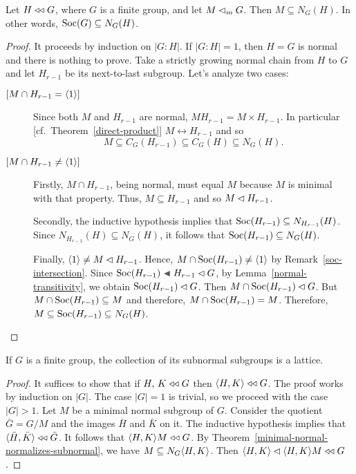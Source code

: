 \begin{thm}\label{minimal-normal-normalizes-subnormal}
    Let\/ $H\mathrel{\triangleleft\triangleleft} G$, where\/ $G$ is a finite group, and let $M\lhd_mG$. Then $M \subseteq N_G(H)$. In other words, ${\rm Soc}(G)\subseteq N_G(H)$.
\end{thm}

\begin{proof} It proceeds by induction on $|G:H|$. If $|G:H|=1$, then $H=G$ is normal and there is nothing to prove. Take a strictly growing normal chain from $H$ to $G$ and let $H_{r-1}$ be its next-to-last subgroup. Let's analyze two cases:
\begin{description}
    \item[\small${[}M\cap H_{r-1}=\langle1\rangle{]}$] Since both $M$ and $H_{r-1}$ are normal, $MH_{r-1}=M\times H_{r-1}$. In particular [cf.~Theorem~\ref{direct-product}] $M\leftrightarrow H_{r-1}$ and so
    $$
        M \subseteq C_G(H_{r-1})\subseteq C_G(H) \subseteq N_G(H).
    $$
    
    \item[\small${[}M\cap H_{r-1}\ne\langle1\rangle{]}$] Firstly, $M\cap H_{r-1}$, being normal, must equal $M$ because $M$ is minimal with that property. Thus, $M\subseteq H_{r-1}$ and so $M\lhd H_{r-1}$. 
    
    Secondly, the inductive hypothesis implies that ${\rm Soc}(H_{r-1})\subseteq N_{H_{r-1}}(H)$. Since $N_{H_{r-1}}(H)\subseteq N_G(H)$, it follows that ${\rm Soc}(H_{r-1})\subseteq N_G(H)$.
    
    Finally, $\langle1\rangle\ne M\lhd H_{r-1}$. Hence, $M\cap{\rm Soc}(H_{r-1})\ne\langle1\rangle$ by Remark~\ref{soc-intersection}. Since $\Soc(H_{r-1})\ch H_{r-1}\normal G$, by Lemma~\ref{normal-transitivity}, we obtain ${\rm Soc}(H_{r-1})\lhd G$. Then $M\cap{\rm Soc}(H_{r-1})\lhd G$. But $M\cap{\rm Soc}(H_{r-1})\subseteq M$ and therefore, $M\cap{\rm Soc}(H_{r-1})=M$. Therefore, $M \subseteq {\rm Soc}(H_{r-1})\subseteq N_G(H)$.
\end{description}
\end{proof}

\begin{thm}\label{subnormal-lattice}
    If\/ $G$ is a finite group, the collection of its subnormal subgroups is a lattice.
\end{thm}

\begin{proof} It suffices to show that if $H,\,K \mathrel{\triangleleft\triangleleft} G$ then\/ $\langle H,K\rangle \mathrel{\triangleleft\triangleleft} G$. The proof works by induction on $|G|$. The case $|G|=1$ is trivial, so we proceed with the case $|G|>1$. Let $M$ be a minimal normal subgroup of $G$. Consider the quotient $\bar G=G/M$ and the images $\bar H$ and $\bar K$ on it. The inductive hypothesis implies that $\langle\bar H,\bar K\rangle\mathrel{\triangleleft\triangleleft}\bar G$. It follows that $\langle H,K\rangle M\mathrel{\triangleleft\triangleleft} G$. By Theorem~\ref{minimal-normal-normalizes-subnormal}, we have $M\subseteq N_G\langle H,K\rangle$. Then $\langle H,K\rangle\lhd \langle H,K\rangle M\mathrel{\triangleleft\triangleleft} G$.  \end{proof}

